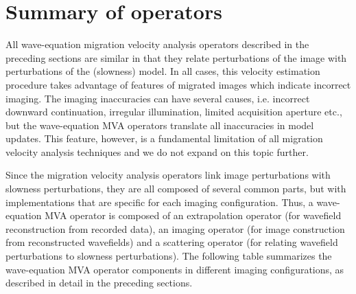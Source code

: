 \def\EOP{\textbf{extrapolation operator}}
\def\IOP{\textbf{imaging operator}}
\def\SOP{\textbf{scattering operator}}

\def\EOPzo{\textit{ \reqs{PHS-ZO}, \ren{SSR-ZO} }}
\def\EOPsr{\textit{ \reqs{PHSs-SR},\ren{PHSr-SR},\ren{SSR-SR} }}
\def\EOPss{\textit{ \reqs{PHS-SS}, \ren{DSR} }}

\def\IOPzo{\textit{ \req{IMC-ZO} }}
\def\IOPsr{\textit{ \req{IMC-SR} }}
\def\IOPss{\textit{ \req{IMC-SS} }}

\def\SOPzo{\textit{ \reqs{ZOFSOP}, \ren{ZOASOP} }}
\def\SOPsr{\textit{ \reqs{SRFSOPs},\ren{SRFSOPr},\ren{SRASOPs},\ren{SRASOPr} }}
\def\SOPss{\textit{ \reqs{SSFSOP}, \ren{SSASOPs},\ren{SSASOPr} }}

\section{Summary of operators}

All wave-equation migration velocity analysis operators described in
the preceding sections are similar in that they relate perturbations
of the image with perturbations of the (slowness) model. In all cases,
this velocity estimation procedure takes advantage of features of
migrated images which indicate incorrect imaging. The imaging
inaccuracies can have several causes, i.e. incorrect downward
continuation, irregular illumination, limited acquisition aperture
etc., but the wave-equation MVA operators translate all inaccuracies
in model updates. This feature, however, is a fundamental limitation
of all migration velocity analysis techniques and we do not expand on
this topic further.

Since the migration velocity analysis operators link image
perturbations with slowness perturbations, they are all composed of
several common parts, but with implementations that are specific for
each imaging configuration. Thus, a wave-equation MVA operator is
composed of an extrapolation operator (for wavefield reconstruction
from recorded data), an imaging operator (for image construction from
reconstructed wavefields) and a scattering operator (for relating
wavefield perturbations to slowness perturbations). The following
table summarizes the wave-equation MVA operator components in
different imaging configurations, as described in detail in the
preceding sections.

